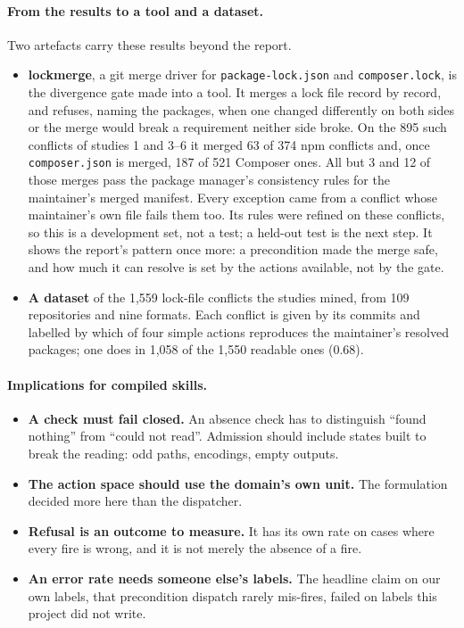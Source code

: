 \documentclass[11pt]{article}
\newcommand{\code}[1]{\texttt{#1}}
\begin{document}
\paragraph{From the results to a tool and a dataset.}
Two artefacts carry these results beyond the report.
\begin{itemize}
  \item \textbf{lockmerge}, a git merge driver for \code{package-lock.json} and
  \code{composer.lock}, is the divergence gate made into a tool. It merges a lock file record by
  record, and refuses, naming the packages, when one changed differently on both sides or the
  merge would break a requirement neither side broke. On the 895 such conflicts of studies 1 and
  3--6 it merged 63 of 374 npm conflicts and, once \code{composer.json} is merged, 187 of 521
  Composer ones. All but 3 and 12 of those merges pass the package manager's consistency rules
  for the maintainer's merged manifest. Every exception came from a conflict whose maintainer's
  own file fails them too. Its rules were refined on these conflicts, so this is a development
  set, not a test; a held-out test is the next step. It shows the report's pattern once more:
  a precondition made the merge safe, and how much it can resolve is set by the actions
  available, not by the gate.
  \item \textbf{A dataset} of the 1,559 lock-file conflicts the studies mined, from 109
  repositories and nine formats. Each conflict is given by its commits and labelled by which
  of four simple actions reproduces the maintainer's resolved packages; one does in 1,058 of the
  1,550 readable ones (0.68).
\end{itemize}

\paragraph{Implications for compiled skills.}
\begin{itemize}
  \item \textbf{A check must fail closed.} An absence check has to distinguish ``found nothing''
  from ``could not read''. Admission should include states built to break the reading: odd
  paths, encodings, empty outputs.
  \item \textbf{The action space should use the domain's own unit.} The formulation decided more
  here than the dispatcher.
  \item \textbf{Refusal is an outcome to measure.} It has its own rate on cases where every fire
  is wrong, and it is not merely the absence of a fire.
  \item \textbf{An error rate needs someone else's labels.} The headline claim on our own
  labels, that precondition dispatch rarely mis-fires, failed on labels this project did not
  write.
\end{itemize}
\end{document}
